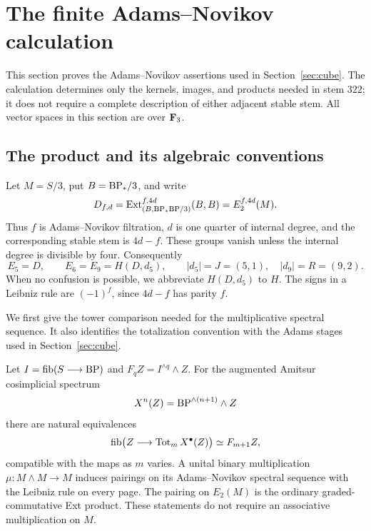 \section{The finite Adams--Novikov calculation}\label{sec:finite}

This section proves the Adams--Novikov assertions used in
Section~\ref{sec:cube}.  The calculation determines only the kernels,
images, and products needed in stem $322$; it does not require a complete
description of either adjacent stable stem.  All vector spaces in this
section are over $\mathbf F_3$.

\subsection{The product and its algebraic conventions}

Let $M=S/3$, put $B=\mathrm{BP}_*/3$, and write
\[
 D_{f,d}=\operatorname{Ext}^{f,4d}_{(B,\mathrm{BP}_*\mathrm{BP}/3)}(B,B)=E_2^{f,4d}(M).
\]
Thus $f$ is Adams--Novikov filtration, $d$ is one quarter of internal degree, and
the corresponding stable stem is $4d-f$.  These groups vanish unless the
internal degree is divisible by four.  Consequently
\[
 E_5=D,\qquad E_6=E_9=H(D,d_5),\qquad
 |d_5|=J=(5,1),\quad |d_9|=R=(9,2).
\]
When no confusion is possible, we abbreviate $H(D,d_5)$ to $H$.
The signs in a Leibniz rule are $(-1)^f$, since $4d-f$ has parity $f$.

We first give the tower comparison needed for the multiplicative
spectral sequence.  It also identifies the totalization convention
with the Adams stages used in Section~\ref{sec:cube}.

\begin{lemma}\label{finite:pairing}
Let $I=\operatorname{fib}(S\longrightarrow\mathrm{BP})$ and
$F_qZ=I^{\wedge q}\wedge Z$.  For the augmented Amitsur cosimplicial
spectrum
\[
 X^n(Z)=\mathrm{BP}^{\wedge(n+1)}\wedge Z
\]
there are natural equivalences
\[
 \operatorname{fib}\bigl(Z\longrightarrow\operatorname{Tot}_m X^\bullet(Z)\bigr)
 \simeq F_{m+1}Z,
\]
compatible with the maps as $m$ varies.  A unital binary multiplication
$\mu\colon M\wedge M\longrightarrow M$ induces pairings on its
Adams--Novikov spectral sequence with the Leibniz rule on every page.
The pairing on $E_2(M)$ is the ordinary graded-commutative Ext product.
These statements do not require an associative multiplication on $M$.
\end{lemma}

